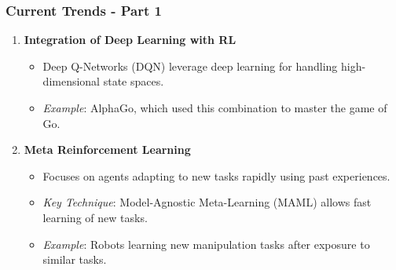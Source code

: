 \documentclass[aspectratio=169]{beamer}
\begin{document}
\begin{frame}[fragile]
    \frametitle{Current Trends - Part 1}
    \begin{enumerate}
        \item \textbf{Integration of Deep Learning with RL}
            \begin{itemize}
                \item Deep Q-Networks (DQN) leverage deep learning for handling high-dimensional state spaces.
                \item \textit{Example}: AlphaGo, which used this combination to master the game of Go.
            \end{itemize}
        
        \item \textbf{Meta Reinforcement Learning}
            \begin{itemize}
                \item Focuses on agents adapting to new tasks rapidly using past experiences.
                \item \textit{Key Technique}: Model-Agnostic Meta-Learning (MAML) allows fast learning of new tasks.
                \item \textit{Example}: Robots learning new manipulation tasks after exposure to similar tasks.
            \end{itemize}
    \end{enumerate}
\end{frame}
\end{document}
